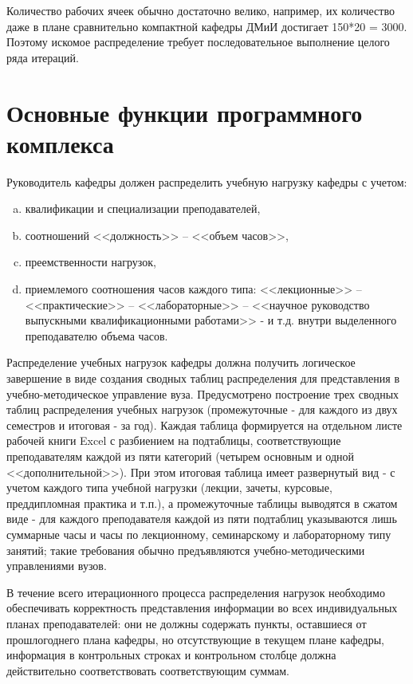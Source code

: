 Количество рабочих ячеек обычно достаточно велико, например, их количество даже в плане сравнительно компактной кафедры
ДМиИ достигает 150*20 = 3000. Поэтому искомое распределение требует последовательное выполнение целого ряда итераций.

\section{Основные функции программного комплекса}\label{AKM_ch3_2}

Руководитель кафедры должен распределить учебную нагрузку кафедры с учетом: 
\begin{enumerate}[a)]
  \item квалификации и специализации преподавателей,
  \item соотношений <<должность>> -- <<объем часов>>,  
  \item преемственности нагрузок, 
  \item приемлемого соотношения часов каждого типа: <<лекционные>> -- <<практические>> -- <<лабораторные>> -- <<научное руководство выпускными квалификационными работами>> - и т.д. внутри выделенного преподавателю объема часов.
\end{enumerate}
 

Распределение учебных нагрузок кафедры должна получить логическое завершение в виде создания сводных таблиц
распределения для представления в учебно-методическое управление вуза. Предусмотрено построение трех сводных таблиц
распределения учебных нагрузок (промежуточные - для каждого из двух семестров и итоговая - за год). Каждая таблица
формируется на отдельном листе рабочей книги \foreignlanguage{english}{Excel} с разбиением на подтаблицы,
соответствующие преподавателям каждой из пяти категорий (четырем основным и одной <<дополнительной>>). При этом итоговая
таблица имеет развернутый вид - с учетом каждого типа учебной нагрузки (лекции, зачеты, курсовые, преддипломная
практика и т.п.), а промежуточные таблицы выводятся в сжатом виде - для каждого преподавателя каждой из пяти подтаблиц
указываются лишь суммарные часы и часы по лекционному, семинарскому и лабораторному типу занятий; такие требования
обычно предъявляются учебно-методическими управлениями вузов.

В течение всего итерационного процесса распределения нагрузок необходимо обеспечивать корректность представления
информации во всех индивидуальных планах преподавателей: они не должны содержать пункты, оставшиеся от прошлогоднего
плана кафедры, но отсутствующие в текущем плане кафедры, информация в контрольных строках и контрольном столбце должна
действительно соответствовать соответствующим суммам.

